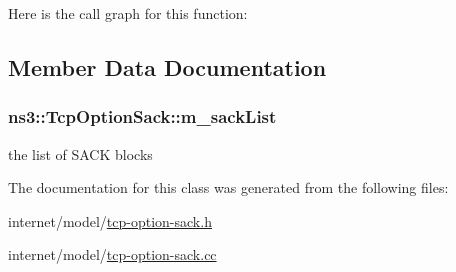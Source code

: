 Here is the call graph for this function\+:




\subsection{Member Data Documentation}
\subsubsection[{\texorpdfstring{m\+\_\+sack\+List}{m_sackList}}]{ ns3\+::\+Tcp\+Option\+Sack\+::m\+\_\+sack\+List\hspace{0.3cm}{\ttfamily [protected]}}\hypertarget{classns3_1_1TcpOptionSack_ae3ea6e0f8848656fa8ab68ca6316dc03}{}\label{classns3_1_1TcpOptionSack_ae3ea6e0f8848656fa8ab68ca6316dc03}


the list of S\+A\+CK blocks 



The documentation for this class was generated from the following files\+:\begin{DoxyCompactItemize}
\item 
internet/model/\hyperlink{tcp-option-sack_8h}{tcp-\/option-\/sack.\+h}\item 
internet/model/\hyperlink{tcp-option-sack_8cc}{tcp-\/option-\/sack.\+cc}\end{DoxyCompactItemize}
